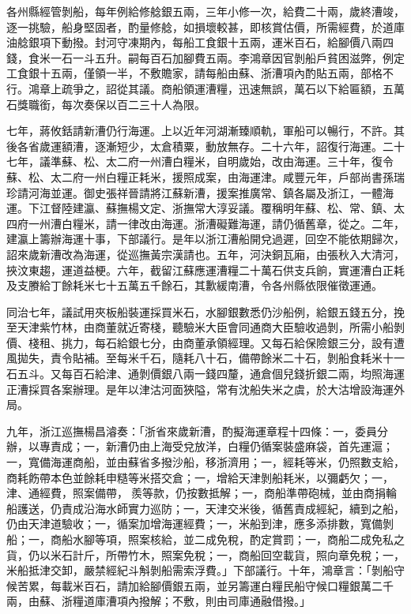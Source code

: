 \begin{pinyinscope}
各州縣經管剝船，每年例給修艌銀五兩，三年小修一次，給費二十兩，歲終漕竣，逐一挑驗，船身堅固者，酌量修艌，如損壞較甚，即核賞估價，所需經費，於道庫油艌銀項下動撥。封河守凍期內，每船工食銀十五兩，運米百石，給腳價八兩四錢，食米一石一斗五升。嗣每百石加腳費五兩。李鴻章因官剝船戶貧困滋弊，例定工食銀十五兩，僅領一半，不敷贍家，請每船由蘇、浙漕項內酌貼五兩，部格不行。鴻章上疏爭之，詔從其議。商船領運漕糧，迅速無誤，萬石以下給匾額，五萬石獎職銜，每次奏保以百二三十人為限。

七年，蔣攸銛請新漕仍行海運。上以近年河湖漸臻順軌，軍船可以暢行，不許。其後各省歲運額漕，逐漸短少，太倉積粟，動放無存。二十六年，詔復行海運。二十七年，議準蘇、松、太二府一州漕白糧米，自明歲始，改由海運。三十年，復令蘇、松、太二府一州白糧正耗米，援照成案，由海運津。咸豐元年，戶部尚書孫瑞珍請河海並運。御史張祥晉請將江蘇新漕，援案推廣常、鎮各屬及浙江，一體海運。下江督陸建瀛、蘇撫楊文定、浙撫常大淳妥議。覆稱明年蘇、松、常、鎮、太四府一州漕白糧米，請一律改由海運。浙漕礙難海運，請仍循舊章，從之。二年，建瀛上籌辦海運十事，下部議行。是年以浙江漕船開兌過遲，回空不能依期歸次，詔來歲新漕改為海運，從巡撫黃宗漢請也。五年，河決銅瓦廂，由張秋入大清河，挾汶東趨，運道益梗。六年，截留江蘇應運漕糧二十萬石供支兵餉，實運漕白正耗及支賸給丁餘耗米七十五萬五千餘石，其歉緩南漕，令各州縣依限催徵運通。

同治七年，議試用夾板船裝運採買米石，水腳銀數悉仍沙船例，給銀五錢五分，挽至天津紫竹林，由商董就近寄棧，聽驗米大臣會同通商大臣驗收過剝，所需小船剝價、棧租、挑力，每石給銀七分，由商董承領經理。又每石給保險銀三分，設有遭風拋失，責令貼補。至每米千石，隨耗八十石，備帶餘米二十石，剝船食耗米十一石五斗。又每百石給津、通剝價銀八兩一錢四釐，通倉個兒錢折銀二兩，均照海運正漕採買各案辦理。是年以津沽河面狹隘，常有沈船失米之虞，於大沽增設海運外局。

九年，浙江巡撫楊昌濬奏：「浙省來歲新漕，酌擬海運章程十四條：一，委員分辦，以專責成；一，新漕仍由上海受兌放洋，白糧仍循案裝盛麻袋，首先運滬；一，寬備海運商船，並由蘇省多撥沙船，移浙濟用；一，經耗等米，仍照數支給，商耗飭帶本色並餘耗申糙等米搭交倉；一，增給天津剝船耗米，以彌虧欠；一，津、通經費，照案備帶，羨等款，仍按數抵解；一，商船準帶砲械，並由商捐輪船護送，仍責成沿海水師實力巡防；一，天津交米後，循舊責成經紀，續到之船，仍由天津道驗收；一，循案加增海運經費；一，米船到津，應多添排數，寬備剝船；一，商船水腳等項，照案核給，並二成免稅，酌定賞罰；一，商船二成免私之貨，仍以米石計斤，所帶竹木，照案免稅；一，商船回空載貨，照向章免稅；一，米船抵津交卸，嚴禁經紀斗斛剝船需索浮費。」下部議行。十年，鴻章言：「剝船守候苦累，每載米百石，請加給腳價銀五兩，並另籌運白糧民船守候口糧銀萬二千兩，由蘇、浙糧道庫漕項內撥解；不敷，則由司庫通融借撥。」


\end{pinyinscope}
